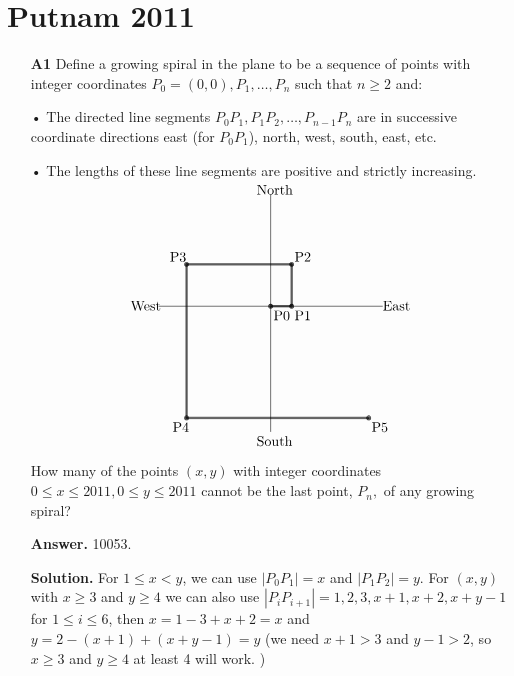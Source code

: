 \documentclass[11pt,a4paper]{article}
\newcommand{\<}{\langle}
\renewcommand{\>}{\rangle}
\begin{document}
\newcommand{\sgn}{\text{sgn}}
\setcounter{secnumdepth}{0}

\section{Putnam 2011}
\begin{enumerate}
	\item [\textbf{A1}] Define a growing spiral in the plane to be a sequence of points with integer coordinates $P_0=(0,0),P_1,\dots,P_n$ such that $n\ge 2$ and:
	
	• The directed line segments $P_0P_1,P_1P_2,\dots,P_{n-1}P_n$ are in successive coordinate directions east (for $P_0P_1$), north, west, south, east, etc.
	
	• The lengths of these line segments are positive and strictly increasing.
	
	\[\begin{picture}(200,180)
	
	\put(20,100){\line(1,0){160}}
	\put(100,10){\line(0,1){170}}
	
	\put(0,97){West}
	\put(180,97){East}
	\put(90,0){South}
	\put(90,180){North}
	
	\put(100,100){\circle{1}}\put(100,100){\circle{2}}\put(100,100){\circle{3}}
	\put(115,100){\circle{1}}\put(115,100){\circle{2}}\put(115,100){\circle{3}}
	\put(115,130){\circle{1}}\put(115,130){\circle{2}}\put(115,130){\circle{3}}
	\put(40,130){\circle{1}}\put(40,130){\circle{2}}\put(40,130){\circle{3}}
	\put(40,20){\circle{1}}\put(40,20){\circle{2}}\put(40,20){\circle{3}}
	\put(170,20){\circle{1}}\put(170,20){\circle{2}}\put(170,20){\circle{3}}
	
	\multiput(100,99.5)(0,.5){3}{\line(1,0){15}}
	\multiput(114.5,100)(.5,0){3}{\line(0,1){30}}
	\multiput(40,129.5)(0,.5){3}{\line(1,0){75}}
	\multiput(39.5,20)(.5,0){3}{\line(0,1){110}}
	\multiput(40,19.5)(0,.5){3}{\line(1,0){130}}
	
	\put(102,90){P0}
	\put(117,90){P1}
	\put(117,132){P2}
	\put(28,132){P3}
	\put(30,10){P4}
	\put(172,10){P5}
	
	\end{picture}\]
	
	
	How many of the points $(x,y)$ with integer coordinates $0\le x\le 2011,0\le y\le 2011$ cannot be the last point, $P_n,$ of any growing spiral?
	
	\textbf{Answer.} 10053. 
	
	\textbf{Solution.} For $1\le x< y$, we can use $|P_0P_1|=x$ and $|P_1P_2|=y$. For $(x, y)$ with $x\ge 3$ and $y\ge 4$ we can also use $|P_iP_{i+1}|=1, 2, 3, x+1, x+2, x+y-1$ for $1\le i\le 6$, then $x=1-3+x+2=x$ and $y=2-(x+1)+(x+y-1)=y$ (we need $x+1>3$ and $y-1>2$, so $x\ge 3$ and $y\ge 4$ at least 4 will work. )
	

\end{enumerate}
\end{document}
